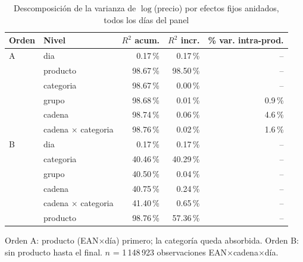 \begin{table}[htbp]
\caption{Descomposici\'on de la varianza de $\log$(precio) por efectos fijos anidados, todos los d\'ias del panel}
\label{tab:varianza}
\centering\scriptsize\setlength{\tabcolsep}{3pt}
\begin{tabular}{@{}llrrr@{}}
\toprule
Orden & Nivel & $R^2$ acum. & $R^2$ incr. & \% var. intra-prod. \\
\midrule
A & dia & 0.17\,\% & 0.17\,\% & -- \\
 & producto & 98.67\,\% & 98.50\,\% & -- \\
 & categoria & 98.67\,\% & 0.00\,\% & -- \\
 & grupo & 98.68\,\% & 0.01\,\% & 0.9\,\% \\
 & cadena & 98.74\,\% & 0.06\,\% & 4.6\,\% \\
 & cadena $\times$ categoria & 98.76\,\% & 0.02\,\% & 1.6\,\% \\
\midrule
B & dia & 0.17\,\% & 0.17\,\% & -- \\
 & categoria & 40.46\,\% & 40.29\,\% & -- \\
 & grupo & 40.50\,\% & 0.04\,\% & -- \\
 & cadena & 40.75\,\% & 0.24\,\% & -- \\
 & cadena $\times$ categoria & 41.40\,\% & 0.65\,\% & -- \\
 & producto & 98.76\,\% & 57.36\,\% & -- \\
\bottomrule\end{tabular}
\par\smallskip\raggedright\scriptsize Orden A: producto (EAN$\times$d\'ia) primero; la categor\'ia queda absorbida. Orden B: sin producto hasta el final. $n$ = 1\,148\,923 observaciones EAN$\times$cadena$\times$d\'ia.
\end{table}
